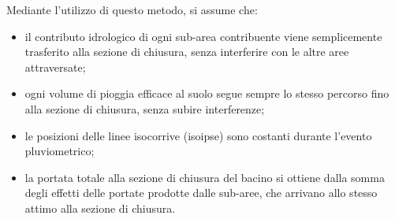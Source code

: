 Mediante l'utilizzo di questo metodo, si assume che:
\begin{itemize}
    \item il contributo idrologico di ogni sub-area contribuente viene semplicemente trasferito alla sezione di chiusura, senza interferire con le altre aree attraversate;
    \item ogni volume di pioggia efficace al suolo segue sempre lo stesso percorso fino alla sezione di chiusura, senza subire interferenze;
    \item le posizioni delle linee isocorrive (isoipse) sono costanti durante l'evento pluviometrico;
    \item la portata totale alla sezione di chiusura del bacino si ottiene dalla somma degli effetti delle portate prodotte dalle sub-aree, che arrivano allo stesso attimo alla sezione di chiusura.
\end{itemize}

